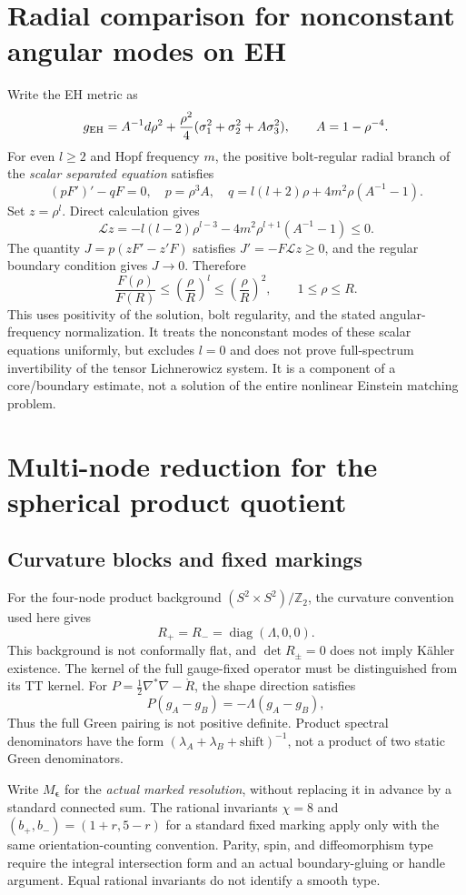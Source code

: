 \documentclass[a4paper,11pt]{article}
\numberwithin{equation}{section}
\theoremstyle{definition}
\newcommand{\Z}{\mathbb Z}
\begin{document}
\section{Radial comparison for nonconstant angular modes on EH}
Write the EH metric as
\[
g_{\rm EH}=A^{-1}d\rho^2+\frac{\rho^2}{4}
(\sigma_1^2+\sigma_2^2+A\sigma_3^2),\qquad A=1-\rho^{-4}.
\]
For even $l\ge2$ and Hopf frequency $m$, the positive bolt-regular radial branch of the \emph{scalar separated equation} satisfies
\[
(pF')'-qF=0,\quad p=\rho^3A,\quad
q=l(l+2)\rho+4m^2\rho(A^{-1}-1).
\]
Set $z=\rho^l$. Direct calculation gives
\[
\mathcal Lz=-l(l-2)\rho^{l-3}-4m^2\rho^{l+1}(A^{-1}-1)\le0.
\]
The quantity $J=p(zF'-z'F)$ satisfies $J'=-F\mathcal Lz\ge0$, and the regular boundary condition gives $J\to0$. Therefore
\begin{equation}\label{eq:angular}
\frac{F(\rho)}{F(R)}\le\left(\frac{\rho}{R}\right)^l
\le\left(\frac{\rho}{R}\right)^2,\qquad1\le\rho\le R.
\end{equation}
This uses positivity of the solution, bolt regularity, and the stated angular-frequency normalization. It treats the nonconstant modes of these scalar equations uniformly, but excludes $l=0$ and does not prove full-spectrum invertibility of the tensor Lichnerowicz system. It is a component of a core/boundary estimate, not a solution of the entire nonlinear Einstein matching problem.

\section{Multi-node reduction for the spherical product quotient}
\subsection{Curvature blocks and fixed markings}
For the four-node product background $(S^2\times S^2)/\Z_2$, the curvature convention used here gives
\[
R_+=R_-=\operatorname{diag}(\Lambda,0,0).
\]
This background is not conformally flat, and $\det R_\pm=0$ does not imply K\"ahler existence. The kernel of the full gauge-fixed operator must be distinguished from its TT kernel. For $P=\frac12\nabla^*\nabla-\mathring R$, the shape direction satisfies
\[
P(g_A-g_B)=-\Lambda(g_A-g_B),
\]
Thus the full Green pairing is not positive definite. Product spectral denominators have the form $(\lambda_A+\lambda_B+\text{shift})^{-1}$, not a product of two static Green denominators.

Write $M_{\boldsymbol\epsilon}$ for the \emph{actual marked resolution}, without replacing it in advance by a standard connected sum. The rational invariants $\chi=8$ and $(b_+,b_-)=(1+r,5-r)$ for a standard fixed marking apply only with the same orientation-counting convention. Parity, spin, and diffeomorphism type require the integral intersection form and an actual boundary-gluing or handle argument. Equal rational invariants do not identify a smooth type.
\end{document}
